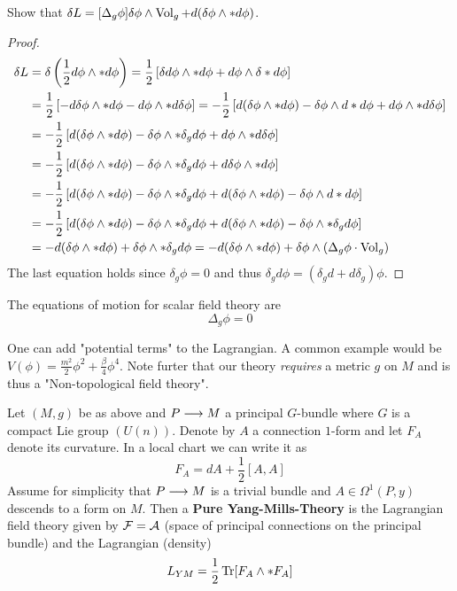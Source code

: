 \begin{ex}
  Show that $ \delta L = [\Delta_g \phi] \delta \phi \wedge \vol_g + d(\delta\phi \wedge * d\phi)$.
\begin{proof}
  \begin{align}
    \delta L &= \delta \left( \frac{1}{2} d \phi \wedge * d\phi \right) = \frac{1}{2} \left[ \delta d \phi \wedge *d\phi + d\phi\wedge \delta * d \phi \right] \\
    &= \frac{1}{2} \left[ -d \delta \phi \wedge *d\phi - d\phi\wedge * d \delta \phi \right] = -\frac{1}{2} \left[ d( \delta \phi \wedge *d\phi) - \delta \phi \wedge d*d\phi + d\phi\wedge * d \delta \phi \right] \\
    &= -\frac{1}{2} \left[ d( \delta \phi \wedge *d\phi) - \delta \phi \wedge *\delta_g d\phi + d\phi\wedge * d \delta \phi \right]\\
    &= -\frac{1}{2} \left[ d( \delta \phi \wedge *d\phi) - \delta \phi \wedge *\delta_g d\phi + d \delta \phi\wedge * d\phi \right]\\
    &= -\frac{1}{2} \left[ d( \delta \phi \wedge *d\phi) - \delta \phi \wedge *\delta_g d\phi + d(\delta \phi \wedge *d\phi) - \delta \phi \wedge d*d\phi \right] \\
    &= -\frac{1}{2} \left[ d( \delta \phi \wedge *d\phi) - \delta \phi \wedge *\delta_g d\phi + d(\delta \phi \wedge *d\phi) - \delta \phi \wedge *\delta_g d \phi \right] \\
    &= - d( \delta \phi \wedge *d\phi) + \delta \phi \wedge *\delta_g d\phi = - d( \delta \phi \wedge *d\phi) + \delta \phi \wedge (\Delta_g \phi \cdot \vol_g)
  \end{align}
  The last equation holds since $\delta_g \phi = 0$ and thus $\delta_g d \phi = (\delta_g d + d \delta_g) \phi$.
\end{proof}
\end{ex}

The equations of motion for scalar field theory are
$$ \Delta_g \phi = 0 $$

\begin{rem}
  One can add "potential terms" to the Lagrangian. A common example would be $V(\phi) = \frac{m^2}{2} \phi^2 + \frac{\beta}{4} \phi^4$. Note furter that our theory \emph{requires} a metric $g$ on $M$ and is thus a "Non-topological field theory".
\end{rem}

\begin{definition}
  Let $(M,g)$ be as above and $P \longrightarrow M$ a principal $G$-bundle where $G$ is a compact Lie group $(U(n))$. Denote by $A$ a connection $1$-form and let $F_A$ denote its curvature. In a local chart we can write it as
  $$ F_A = dA + \frac{1}{2}[A,A] $$
  Assume for simplicity that $P \longrightarrow M$ is a trivial bundle and $A \in \Omega^1(P,y)$ descends to a form on $M$. Then a \textbf{Pure Yang-Mills-Theory} is the Lagrangian field theory given by ${\mathcal{F}} = \mathcal{A}$ (space of principal connections on the principal bundle) and the Lagrangian (density)
  $$ L_{YM} = \frac{1}{2} \operatorname{Tr}[F_A \wedge * F_A] $$
\end{definition}

